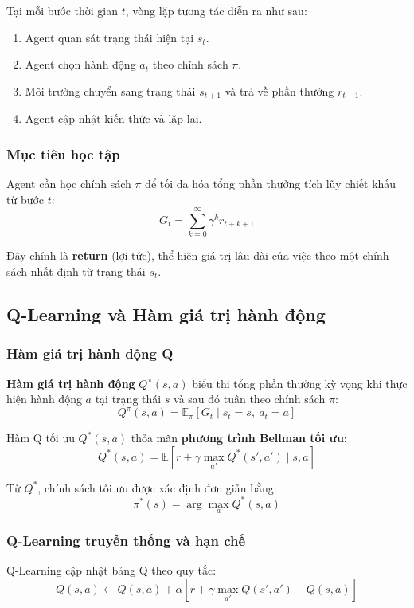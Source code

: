 Tại mỗi bước thời gian $t$, vòng lặp tương tác diễn ra như sau:
\begin{enumerate}
    \item Agent quan sát trạng thái hiện tại $s_t$.
    \item Agent chọn hành động $a_t$ theo chính sách $\pi$.
    \item Môi trường chuyển sang trạng thái $s_{t+1}$ và trả về phần thưởng $r_{t+1}$.
    \item Agent cập nhật kiến thức và lặp lại.
\end{enumerate}

\subsubsection{Mục tiêu học tập}

Agent cần học chính sách $\pi$ để tối đa hóa tổng phần thưởng tích lũy chiết khấu từ bước $t$:
\[
G_t = \sum_{k=0}^{\infty} \gamma^k r_{t+k+1}
\]

Đây chính là \textbf{return} (lợi tức), thể hiện giá trị lâu dài của việc theo một chính sách nhất định từ trạng thái $s_t$.

\subsection{Q-Learning và Hàm giá trị hành động}

\subsubsection{Hàm giá trị hành động Q}

\textbf{Hàm giá trị hành động} $Q^\pi(s, a)$ biểu thị tổng phần thưởng kỳ vọng khi thực hiện hành động $a$ tại trạng thái $s$ và sau đó tuân theo chính sách $\pi$:
\[
Q^\pi(s, a) = \mathbb{E}_\pi\left[G_t \mid s_t = s,\ a_t = a\right]
\]

Hàm Q tối ưu $Q^*(s, a)$ thỏa mãn \textbf{phương trình Bellman tối ưu}:
\[
Q^*(s, a) = \mathbb{E}\left[r + \gamma \max_{a'} Q^*(s', a') \mid s, a\right]
\]

Từ $Q^*$, chính sách tối ưu được xác định đơn giản bằng:
\[
\pi^*(s) = \arg\max_a Q^*(s, a)
\]

\subsubsection{Q-Learning truyền thống và hạn chế}

Q-Learning cập nhật bảng Q theo quy tắc:
\[
Q(s, a) \leftarrow Q(s, a) + \alpha \left[r + \gamma \max_{a'} Q(s', a') - Q(s, a)\right]
\]

